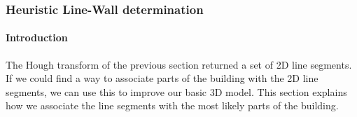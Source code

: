 \documentclass[10pt]{article}
\begin{document}
\subsubsection{Heuristic Line-Wall determination}
%
% 
% 

	\paragraph{Introduction}
	The Hough transform of the previous section returned a set of 2D line
	segments.  If we could find a way to associate parts of the building with
	the 2D line segments, we can use this to improve our basic 3D model.
	This section explains how we associate the line segments with the most
	likely parts of the building. \\
\end{document}
